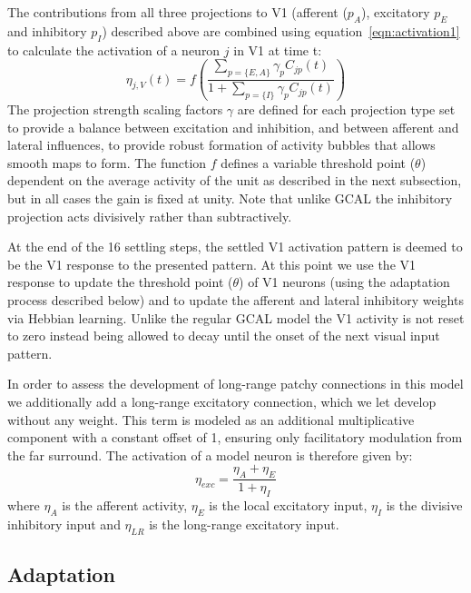 The contributions from all three projections to V1 (afferent
($p_{A}$), excitatory $p_{E}$ and inhibitory $p_{I}$) described above
are combined using equation~\ref{eqn:activation1} to calculate the
activation of a neuron $j$ in V1 at time t:
\begin{equation}
\eta_{j,V}(t)=f\left(\frac{\sum_{p=\{E, A\}}\gamma_{p}C_{jp}(t)}{1+\sum_{p=\{I\}}\gamma_{p}C_{jp}(t)}\right)
\label{eqn:activation1}
\end{equation}
The projection strength scaling factors $\gamma$ are defined for each
projection type set to provide a balance between excitation and
inhibition, and between afferent and lateral influences, to provide
robust formation of activity bubbles that allows smooth maps to
form. The function $f$ defines a variable threshold point ($\theta$)
dependent on the average activity of the unit as described in the next
subsection, but in all cases the gain is fixed at unity. Note that
unlike GCAL the inhibitory projection acts divisively rather than
subtractively.

At the end of the 16 settling steps, the settled V1 activation pattern
is deemed to be the V1 response to the presented pattern. At this
point we use the V1 response to update the threshold point ($\theta$)
of V1 neurons (using the adaptation process described below) and to
update the afferent and lateral inhibitory weights via Hebbian
learning. Unlike the regular GCAL model the V1 activity is not reset
to zero instead being allowed to decay until the onset of the next
visual input pattern.

In order to assess the development of long-range patchy connections in
this model we additionally add a long-range excitatory connection,
which we let develop without any weight. This term is modeled as an
additional multiplicative component with a constant offset of 1,
ensuring only facilitatory modulation from the far surround. The
activation of a model neuron is therefore given by:
\begin{equation}
  \eta_{exc} = \frac{\eta_{A} + \eta_{E}}{1 + \eta_{I}}
\end{equation}
where $\eta_A$ is the afferent activity, $\eta_E$ is the local
excitatory input, $\eta_I$ is the divisive inhibitory input and
$\eta_{LR}$ is the long-range excitatory input.

\subsection*{Adaptation}


